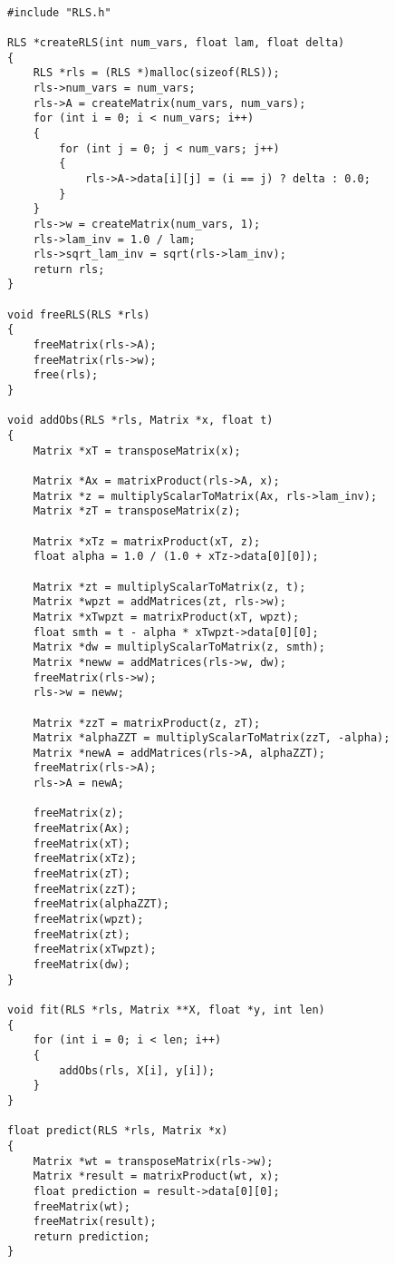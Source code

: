 \begin{lstlisting}[caption=\raggedright{mcu-libs/RLS.cpp}, frame=single]
    
#include "RLS.h"

RLS *createRLS(int num_vars, float lam, float delta)
{
    RLS *rls = (RLS *)malloc(sizeof(RLS));
    rls->num_vars = num_vars;
    rls->A = createMatrix(num_vars, num_vars);
    for (int i = 0; i < num_vars; i++)
    {
        for (int j = 0; j < num_vars; j++)
        {
            rls->A->data[i][j] = (i == j) ? delta : 0.0;
        }
    }
    rls->w = createMatrix(num_vars, 1);
    rls->lam_inv = 1.0 / lam;
    rls->sqrt_lam_inv = sqrt(rls->lam_inv);
    return rls;
}

void freeRLS(RLS *rls)
{
    freeMatrix(rls->A);
    freeMatrix(rls->w);
    free(rls);
}

void addObs(RLS *rls, Matrix *x, float t)
{
    Matrix *xT = transposeMatrix(x);

    Matrix *Ax = matrixProduct(rls->A, x);
    Matrix *z = multiplyScalarToMatrix(Ax, rls->lam_inv);
    Matrix *zT = transposeMatrix(z);

    Matrix *xTz = matrixProduct(xT, z);
    float alpha = 1.0 / (1.0 + xTz->data[0][0]);

    Matrix *zt = multiplyScalarToMatrix(z, t);
    Matrix *wpzt = addMatrices(zt, rls->w);
    Matrix *xTwpzt = matrixProduct(xT, wpzt);
    float smth = t - alpha * xTwpzt->data[0][0];
    Matrix *dw = multiplyScalarToMatrix(z, smth);
    Matrix *neww = addMatrices(rls->w, dw);
    freeMatrix(rls->w);
    rls->w = neww;

    Matrix *zzT = matrixProduct(z, zT);
    Matrix *alphaZZT = multiplyScalarToMatrix(zzT, -alpha);
    Matrix *newA = addMatrices(rls->A, alphaZZT);
    freeMatrix(rls->A);
    rls->A = newA;

    freeMatrix(z);
    freeMatrix(Ax);
    freeMatrix(xT);
    freeMatrix(xTz);
    freeMatrix(zT);
    freeMatrix(zzT);
    freeMatrix(alphaZZT);
    freeMatrix(wpzt);
    freeMatrix(zt);
    freeMatrix(xTwpzt);
    freeMatrix(dw);
}

void fit(RLS *rls, Matrix **X, float *y, int len)
{
    for (int i = 0; i < len; i++)
    {
        addObs(rls, X[i], y[i]);
    }
}

float predict(RLS *rls, Matrix *x)
{
    Matrix *wt = transposeMatrix(rls->w);
    Matrix *result = matrixProduct(wt, x);
    float prediction = result->data[0][0];
    freeMatrix(wt);
    freeMatrix(result);
    return prediction;
}


\end{lstlisting}
